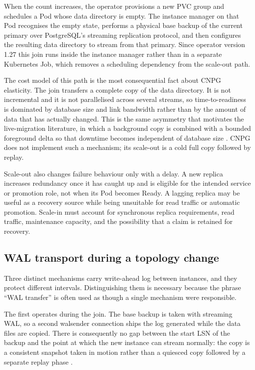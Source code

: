 \documentclass[11pt,a4paper]{article}
\begin{document}
When the count increases, the operator provisions a new PVC group and schedules a Pod whose data directory is empty. The instance manager on that Pod recognises the empty state, performs a physical base backup of the current primary over PostgreSQL's streaming replication protocol, and then configures the resulting data directory to stream from that primary. Since operator version 1.27 this join runs inside the instance manager rather than in a separate Kubernetes Job, which removes a scheduling dependency from the scale-out path.

The cost model of this path is the most consequential fact about CNPG elasticity. The join transfers a complete copy of the data directory. It is not incremental and it is not parallelised across several streams, so time-to-readiness is dominated by database size and link bandwidth rather than by the amount of data that has actually changed. This is the same asymmetry that motivates the live-migration literature, in which a background copy is combined with a bounded foreground delta so that downtime becomes independent of database size \cite{curino-relational-cloud}. CNPG does not implement such a mechanism; its scale-out is a cold full copy followed by replay.

Scale-out also changes failure behaviour only with a delay. A new replica increases redundancy once it has caught up and is eligible for the intended service or promotion role, not when its Pod becomes Ready. A lagging replica may be useful as a recovery source while being unsuitable for read traffic or automatic promotion. Scale-in must account for synchronous replica requirements, read traffic, maintenance capacity, and the possibility that a claim is retained for recovery.

\subsection{WAL transport during a topology change}

Three distinct mechanisms carry write-ahead log between instances, and they protect different intervals. Distinguishing them is necessary because the phrase ``WAL transfer'' is often used as though a single mechanism were responsible.

The first operates during the join. The base backup is taken with streaming WAL, so a second walsender connection ships the log generated while the data files are copied. There is consequently no gap between the start LSN of the backup and the point at which the new instance can stream normally: the copy is a consistent snapshot taken in motion rather than a quiesced copy followed by a separate replay phase \cite{pg-basebackup}.
\end{document}
